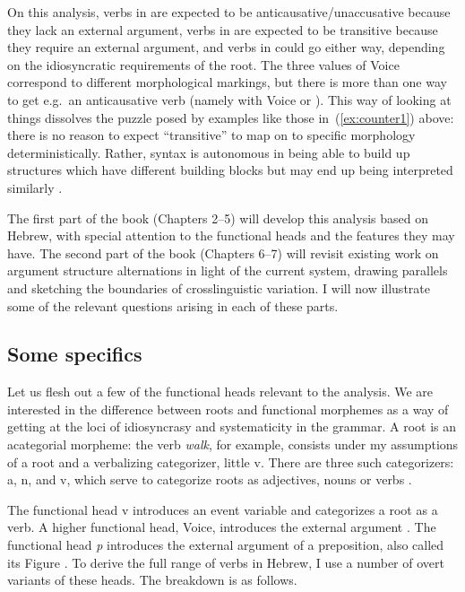 On this analysis, verbs in {\tnif} are expected to be anticausative/unaccusative because they lack an external argument, verbs in {\thif} are expected to be transitive because they require an external argument, and verbs in {\tkal} could go either way, depending on the idiosyncratic requirements of the root. The three values of Voice correspond to different morphological markings, but there is more than one way to get e.g.~an anticausative verb (namely with Voice or {\vz}). This way of looking at things dissolves the puzzle posed by examples like those in~(\ref{ex:counter1}) above: there is no reason to expect ``transitive'' to map on to specific morphology deterministically. Rather, syntax is autonomous in being able to build up structures which have different building blocks but may end up being interpreted similarly \citep{wood15springer,woodmarantz17,kastner16phd,myler16mit}.

The first part of the book (Chapters 2--5) will develop this analysis based on Hebrew, with special attention to the functional heads and the features they may have. The second part of the book (Chapters 6--7) will revisit existing work on argument structure alternations in light of the current system, drawing parallels and sketching the boundaries of crosslinguistic variation. I will now illustrate some of the relevant questions arising in each of these parts.




	\subsection{Some specifics}
Let us flesh out a few of the functional heads relevant to the analysis. We are interested in the difference between roots and functional morphemes as a way of getting at the loci of idiosyncrasy and systematicity in the grammar. A root is an acategorial morpheme: the verb \emph{walk}, for example, consists under my assumptions of a root  and a verbalizing categorizer, little v. There are three such categorizers: a, n, and v, which serve to categorize roots as adjectives, nouns or verbs \citep{marantz01,arad05,woodmarantz15}.

The functional head v introduces an event variable and categorizes a root as a verb. A higher functional head, Voice, introduces the external argument \citep{kratzer96,pylkkanen08,marantz13lingua}. The functional head \emph{p} introduces the external argument of a preposition, also called its Figure \citep{svenonius03,svenonius07,wood14nllt}. To derive the full range of verbs in Hebrew, I use a number of overt variants of these heads. The breakdown is as follows.

